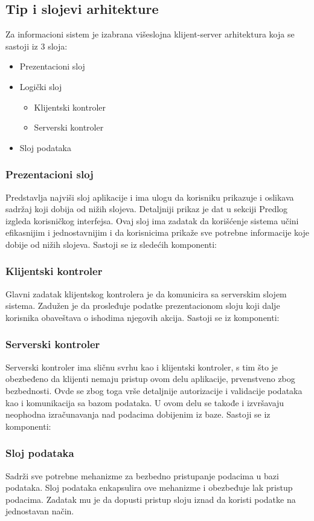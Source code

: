 \subsection{\bfseries Tip i slojevi arhitekture}

Za informacioni sistem je izabrana višeslojna klijent-server arhitektura koja se sastoji iz 3 sloja:
\begin{itemize}
    \item Prezentacioni sloj
    \item Logički sloj
    \begin{itemize}
        \item Klijentski kontroler
        \item Serverski kontroler
    \end{itemize}
    \item Sloj podataka
\end{itemize}

\subsubsection{\bfseries Prezentacioni sloj}

Predstavlja najviši sloj aplikacije i ima ulogu da korisniku
prikazuje i oslikava sadržaj koji dobija od nižih slojeva. Detaljniji prikaz je dat u sekciji Predlog izgleda korisničkog interfejsa. Ovaj sloj ima zadatak da korišćenje sistema učini efikasnijim i jednostavnijim i da korisnicima prikaže sve potrebne informacije koje dobije od nižih slojeva.
\newline
Sastoji se iz sledećih komponenti:

\subsubsection{\bfseries Klijentski kontroler}

Glavni zadatak klijentskog kontrolera je da komunicira sa serverskim slojem sistema. Zadužen je da prosleđuje podatke prezentacionom sloju koji dalje korisnika obaveštava o ishodima njegovih akcija.
\newline
Sastoji se iz komponenti:

\subsubsection{\bfseries Serverski kontroler}

Serverski kontroler ima sličnu svrhu kao i klijentski kontroler, s tim što je obezbeđeno da klijenti nemaju pristup ovom delu aplikacije, prvenstveno zbog bezbednosti. Ovde se zbog toga vrše detaljnije autorizacije i validacije podataka kao i komunikacija sa bazom podataka. U ovom delu se takođe i izvršavaju neophodna izračunavanja nad podacima dobijenim iz baze.
\newline
Sastoji se iz komponenti:

\subsubsection{\bfseries Sloj podataka}
Sadrži sve potrebne mehanizme za bezbedno pristupanje podacima u bazi podataka. Sloj podataka enkapsulira ove mehanizme i obezbeđuje lak pristup podacima. Zadatak mu je da dopusti pristup sloju iznad da koristi podatke na jednostavan način.